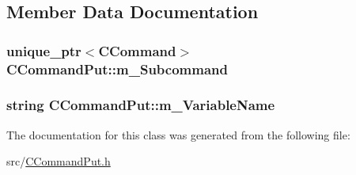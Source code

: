 \subsection{Member Data Documentation}
\subsubsection[{\texorpdfstring{m\+\_\+\+Subcommand}{m_Subcommand}}]{\setlength{\rightskip}{0pt plus 5cm}unique\+\_\+ptr$<${\bf C\+Command}$>$ C\+Command\+Put\+::m\+\_\+\+Subcommand\hspace{0.3cm}{\ttfamily [private]}}\hypertarget{classCCommandPut_abf1c7a0d0d5c112640b529ba90637d74}{}\label{classCCommandPut_abf1c7a0d0d5c112640b529ba90637d74}
\subsubsection[{\texorpdfstring{m\+\_\+\+Variable\+Name}{m_VariableName}}]{\setlength{\rightskip}{0pt plus 5cm}string C\+Command\+Put\+::m\+\_\+\+Variable\+Name\hspace{0.3cm}{\ttfamily [private]}}\hypertarget{classCCommandPut_a583f3fd126a5fc69456c4538e1783f00}{}\label{classCCommandPut_a583f3fd126a5fc69456c4538e1783f00}


The documentation for this class was generated from the following file\+:\begin{DoxyCompactItemize}
\item 
src/\hyperlink{CCommandPut_8h}{C\+Command\+Put.\+h}\end{DoxyCompactItemize}

